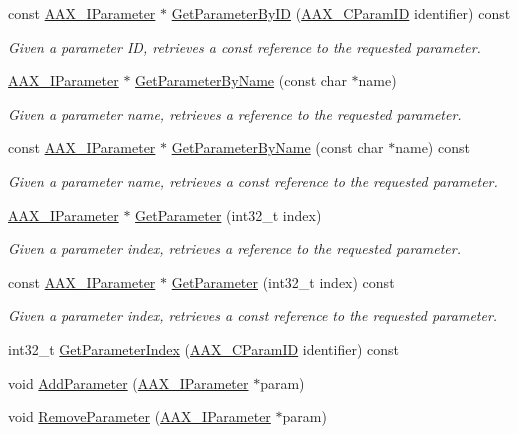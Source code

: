 \begin{DoxyCompactItemize}
const \hyperlink{a00108}{A\+A\+X\+\_\+\+I\+Parameter} $\ast$ \hyperlink{a00034_a8f4480191bec83fb7e50d157dd83ccab}{Get\+Parameter\+By\+I\+D} (\hyperlink{a00149_a1440c756fe5cb158b78193b2fc1780d1}{A\+A\+X\+\_\+\+C\+Param\+I\+D} identifier) const 
\begin{DoxyCompactList}\small\item\em Given a parameter I\+D, retrieves a const reference to the requested parameter. \end{DoxyCompactList}\item 
\hyperlink{a00108}{A\+A\+X\+\_\+\+I\+Parameter} $\ast$ \hyperlink{a00034_a65819f05cca51224d92ac0b620d2b354}{Get\+Parameter\+By\+Name} (const char $\ast$name)
\begin{DoxyCompactList}\small\item\em Given a parameter name, retrieves a reference to the requested parameter. \end{DoxyCompactList}\item 
const \hyperlink{a00108}{A\+A\+X\+\_\+\+I\+Parameter} $\ast$ \hyperlink{a00034_a6e065995c36c5f1380ab29d16170ec48}{Get\+Parameter\+By\+Name} (const char $\ast$name) const 
\begin{DoxyCompactList}\small\item\em Given a parameter name, retrieves a const reference to the requested parameter. \end{DoxyCompactList}\item 
\hyperlink{a00108}{A\+A\+X\+\_\+\+I\+Parameter} $\ast$ \hyperlink{a00034_aaee339546c6cf99e3b7c8a6061c7a4f3}{Get\+Parameter} (int32\+\_\+t index)
\begin{DoxyCompactList}\small\item\em Given a parameter index, retrieves a reference to the requested parameter. \end{DoxyCompactList}\item 
const \hyperlink{a00108}{A\+A\+X\+\_\+\+I\+Parameter} $\ast$ \hyperlink{a00034_acaa1d205cabd4f9b883440014e293608}{Get\+Parameter} (int32\+\_\+t index) const 
\begin{DoxyCompactList}\small\item\em Given a parameter index, retrieves a const reference to the requested parameter. \end{DoxyCompactList}\item 
int32\+\_\+t \hyperlink{a00034_ae0f8bc23f8edee29b61de34e3a09b065}{Get\+Parameter\+Index} (\hyperlink{a00149_a1440c756fe5cb158b78193b2fc1780d1}{A\+A\+X\+\_\+\+C\+Param\+I\+D} identifier) const 
\item 
void \hyperlink{a00034_ae2f9631b33c012f7a8c042df9655b28c}{Add\+Parameter} (\hyperlink{a00108}{A\+A\+X\+\_\+\+I\+Parameter} $\ast$param)
\item 
void \hyperlink{a00034_ac3a21fe1267f8fb276aa08e9f492c5ed}{Remove\+Parameter} (\hyperlink{a00108}{A\+A\+X\+\_\+\+I\+Parameter} $\ast$param)
\end{DoxyCompactItemize}
